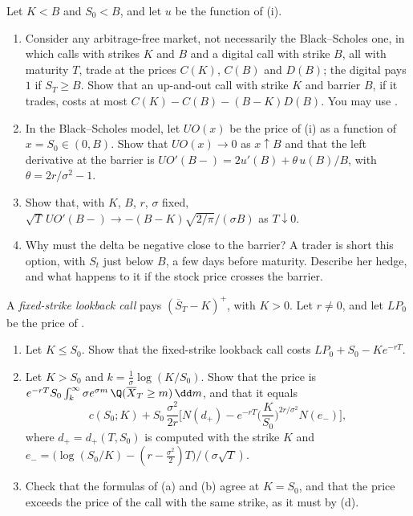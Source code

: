 \begin{exercise}\label{ex:exo-barrier-bounds}
\medium Let $K<B$ and $S_0<B$, and let $u$ be the function of (i).
\begin{enumerate}[label=(\alph*)]
  \item Consider any arbitrage-free market, not necessarily the Black--Scholes one, in which
    calls with strikes $K$ and $B$ and a digital call with strike $B$, all with maturity $T$, trade
    at the prices $C(K)$, $C(B)$ and $D(B)$; the digital pays $1$ if $S_T\ge B$. Show that an up-and-out call with strike $K$ and
    barrier $B$, if it trades, costs at most $C(K)-C(B)-(B-K)D(B)$. You may use
    .
  \item In the Black--Scholes model, let $UO(x)$ be the price of (i) as a
    function of $x=S_0\in(0,B)$. Show that $UO(x)\to0$ as $x\uparrow B$ and that the left derivative
    at the barrier is $UO'(B-)=2u'(B)+\theta\,u(B)/B$, with $\theta=2r/\sigma^2-1$.
  \item Show that, with $K$, $B$, $r$, $\sigma$ fixed, $\sqrt T\,UO'(B-)\to-(B-K)\sqrt{2/\pi}/(\sigma B)$ as
    $T\downarrow0$.
  \item Why must the delta be negative close to the barrier? A trader is short this option, with
    $S_t$ just below $B$, a few days before maturity. Describe her hedge, and what happens to it if
    the stock price crosses the barrier.
\end{enumerate}
\end{exercise}

\begin{exercise}\label{ex:exo-fixed-lookback}
\medium A \emph{fixed-strike lookback call} pays $(\overline S_T-K)^+$, with $K>0$. Let $r\ne0$, and
let $LP_0$ be the price of .
\begin{enumerate}[label=(\alph*)]
  \item Let $K\le S_0$. Show that the fixed-strike lookback call costs $LP_0+S_0-Ke^{-rT}$.
  \item Let $K>S_0$ and $k=\frac1\sigma\log(K/S_0)$. Show that the price is
    $e^{-rT}S_0\int_k^\infty\sigma e^{\sigma m}\,\Q(\overline X_T\ge m)\,\dd m$, and that it equals
    \[
      c(S_0;K)+S_0\,\frac{\sigma^2}{2r}\Big[N(d_+)-e^{-rT}\Big(\frac K{S_0}\Big)^{2r/\sigma^2}N(e_-)\Big],
    \]
    where $d_+=d_+(T,S_0)$ is computed with the strike $K$ and
    $e_-=\big(\log(S_0/K)-(r-\frac{\sigma^2}2)T\big)/(\sigma\sqrt T)$.
  \item Check that the formulas of (a) and (b) agree at $K=S_0$, and that the price exceeds the
    price of the call with the same strike, as it must by (d).
\end{enumerate}
\end{exercise}

